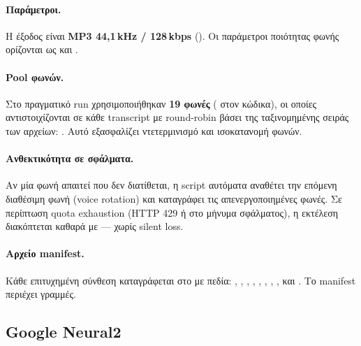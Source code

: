 \paragraph{Παράμετροι.}
Η έξοδος είναι \textbf{MP3 44,1\,kHz / 128\,kbps}
().
Οι παράμετροι ποιότητας φωνής ορίζονται ως
 και .

\paragraph{Pool φωνών.}
Στο πραγματικό run χρησιμοποιήθηκαν \textbf{19 φωνές}
( στον κώδικα),
οι οποίες αντιστοιχίζονται σε κάθε transcript με round-robin
βάσει της ταξινομημένης σειράς των αρχείων:
.
Αυτό εξασφαλίζει ντετερμινισμό και ισοκατανομή φωνών.

\paragraph{Ανθεκτικότητα σε σφάλματα.}
Αν μία φωνή απαιτεί  που δεν διατίθεται,
η script αυτόματα αναθέτει την επόμενη διαθέσιμη φωνή
(voice rotation) και καταγράφει τις απενεργοποιημένες φωνές.
Σε περίπτωση quota exhaustion (HTTP 429 ή  στο
μήνυμα σφάλματος), η εκτέλεση διακόπτεται καθαρά με
 — χωρίς silent loss.

\paragraph{Αρχείο manifest.}
Κάθε επιτυχημένη σύνθεση καταγράφεται στο
 με πεδία:
, , ,
, , ,
, ,
 και .
Το manifest περιέχει  γραμμές.

\subsection{Google Neural2}
\label{subsec:google-tts}

